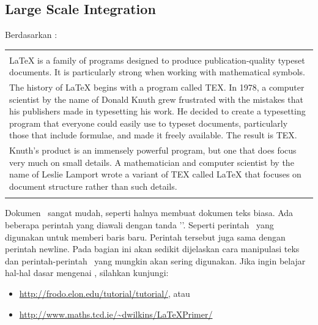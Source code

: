 \chapter{\babDua}

\section{Large Scale Integration}
Berdasarkan \cite{latex.intro}: \\ 
\begin{tabular}{| p{13cm} |}
	\hline 
	\\
	LaTeX is a family of programs designed to produce publication-quality typeset documents. It is particularly strong when working with mathematical symbols. \\	
	The history of LaTeX begins with a program called TEX. In 1978, a 
	computer scientist by the name of Donald Knuth grew frustrated with the mistakes that his publishers made in typesetting his work. He decided to create a typesetting program that everyone could easily use to typeset documents, particularly those that include formulae, and made it freely available. The result is TEX. \\	
	Knuth's product is an immensely powerful program, but one that does focus very much on small details. A mathematician and computer scientist by the name of Leslie Lamport wrote a variant of TEX called LaTeX that focuses on document structure rather than such details. \\
	\\
	\hline
\end{tabular}

\vspace*{0.8cm}

Dokumen \latex~sangat mudah, seperti halnya membuat dokumen teks biasa. Ada beberapa perintah yang diawali dengan tanda '\bslash'. 
Seperti perintah \bslash\bslash~yang digunakan untuk memberi baris baru. Perintah tersebut juga sama dengan perintah \bslash newline. 
Pada bagian ini akan sedikit dijelaskan cara manipulasi teks dan  perintah-perintah \latex~yang mungkin akan sering digunakan. Jika ingin belajar hal-hal dasar mengenai \latex, silahkan kunjungi:

\begin{itemize}
	\item \url{http://frodo.elon.edu/tutorial/tutorial/}, atau \item \url{http://www.maths.tcd.ie/~dwilkins/LaTeXPrimer/}
\end{itemize}

